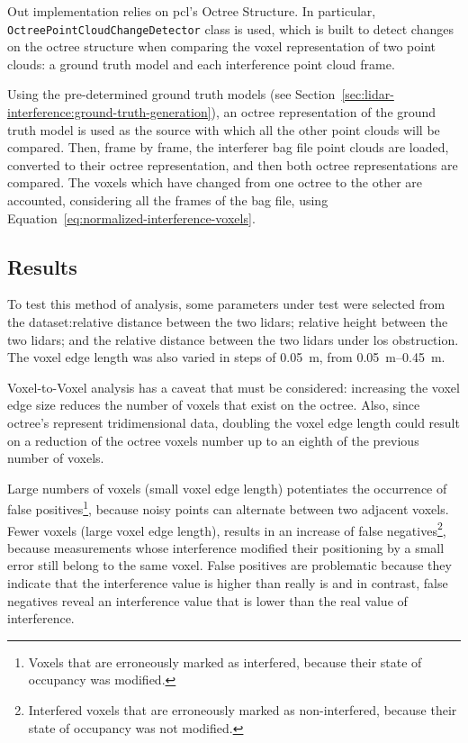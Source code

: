 Out implementation relies on \ac{pcl}'s Octree Structure. In particular, \texttt{OctreePointCloudChangeDetector} class is used, which is built to detect changes on the octree structure when comparing the voxel representation of two point clouds: a ground truth model and each interference point cloud frame. 

Using the pre-determined ground truth models (see Section~\ref{sec:lidar-interference:ground-truth-generation}), an octree representation of the ground truth model is used as the source with which all the other point clouds will be compared. Then, frame by frame, the interferer bag file point clouds are loaded, converted to their octree representation, and then both octree representations are compared. The voxels which have changed from one octree to the other are accounted, considering all the frames of the bag file, using Equation~\eqref{eq:normalized-interference-voxels}.


\subsection{Results}
\label{subsec:lidar-interference:voxel-to-voxel-analysis}

To test this method of analysis, some parameters under test were selected from the dataset:relative distance between the two \acp{lidar}; relative height between the two \acp{lidar}; and the relative distance between the two \acp{lidar} under \ac{los} obstruction. The voxel edge length was also varied in steps of \SI{0.05}{\meter}, from \SIrange{0.05}{0.45}{\meter}.

Voxel-to-Voxel analysis has a caveat that must be considered: increasing the voxel edge size reduces the number of voxels that exist on the octree. Also, since octree's represent tridimensional data, doubling the voxel edge length could result on a reduction of the octree voxels number up to an eighth of the previous number of voxels. 

Large numbers of voxels (small voxel edge length) potentiates the occurrence of false positives\footnote{Voxels that are erroneously marked as interfered, because their state of occupancy was modified.}, because noisy points can alternate between two adjacent voxels. Fewer voxels (large voxel edge length), results in an increase of false negatives\footnote{Interfered voxels that are erroneously marked as non-interfered, because their state of occupancy was not modified.}, because measurements whose interference modified their positioning by a small error still belong to the same voxel. False positives are problematic because they indicate that the interference value is higher than really is and in contrast, false negatives reveal an interference value that is lower than the real value of interference.


